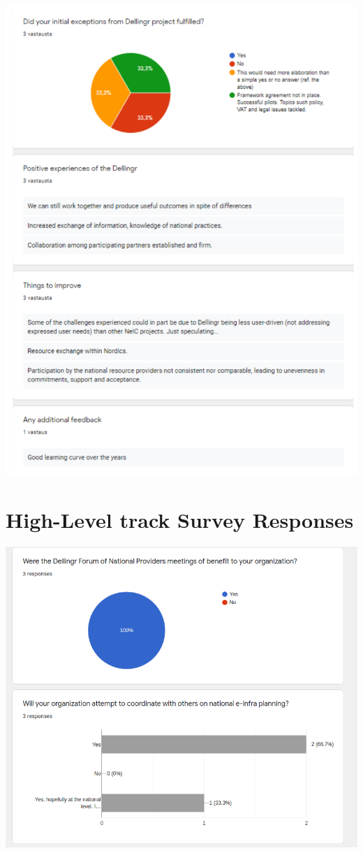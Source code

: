 \documentclass{article}
\newcommand{\HLT}{High-Level track\xspace}
\begin{document}
\begin{appendices}
\begin{center}
\includegraphics[scale=0.7]{SG_responses_2.pdf}
\end{center}

\newpage
\section{\HLT Survey Responses}
\label{app:hlt-resp}

\begin{center}
\includegraphics[scale=0.6]{hlt_responses_1.png}
\end{center}


\end{appendices}
\end{document}
